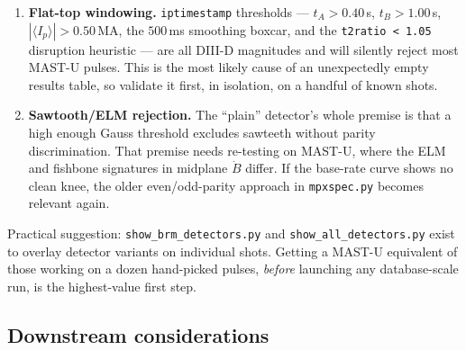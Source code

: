 \documentclass[11pt,a4paper]{article}
\newcommand{\code}[1]{\texttt{\small #1}}
\begin{document}
\begin{enumerate}[leftmargin=2em]
expected growth time.
\item \textbf{Flat-top windowing.} \code{iptimestamp} thresholds --- $t_A > 0.40$\,s,
$t_B > 1.00$\,s, $|\langle I_p\rangle| > 0.50$\,MA, the $500$\,ms smoothing boxcar, and the
\code{t2ratio < 1.05} disruption heuristic --- are all DIII-D magnitudes and will silently reject
most MAST-U pulses. This is the most likely cause of an unexpectedly empty results table, so
validate it first, in isolation, on a handful of known shots.
\item \textbf{Sawtooth/ELM rejection.} The ``plain'' detector's whole premise is that a high enough
Gauss threshold excludes sawteeth without parity discrimination. That premise needs re-testing on
MAST-U, where the ELM and fishbone signatures in midplane $\dot B$ differ. If the base-rate curve
shows no clean knee, the older even/odd-parity approach in \code{mpxspec.py} becomes relevant again.
\end{enumerate}

\noindent
Practical suggestion: \code{show\_brm\_detectors.py} and \code{show\_all\_detectors.py} exist to
overlay detector variants on individual shots. Getting a MAST-U equivalent of those working on a
dozen hand-picked pulses, \emph{before} launching any database-scale run, is the highest-value
first step.

\subsection{Downstream considerations}
\end{document}
